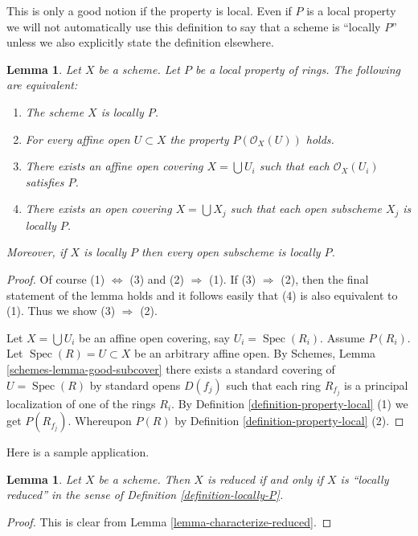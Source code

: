 \documentclass{stacks-project}
\theoremstyle{plain}
\newtheorem{lemma}[subsection]{Lemma}
\theoremstyle{definition}
\theoremstyle{remark}
\numberwithin{equation}{subsection}
\def\Spec{\mathop{\mathrm{Spec}}}
\begin{document}
\noindent
This is only a good notion if the property is local.
Even if $P$ is a local property we will not
automatically use this definition to say that a scheme is
``locally $P$'' unless we also explicitly state the definition
elsewhere.

\begin{lemma}
\label{lemma-locally-P}
Let $X$ be a scheme. Let $P$ be a local property of rings.
The following are equivalent:
\begin{enumerate}
\item The scheme $X$ is locally $P$.
\item For every affine open $U \subset X$ the property
$P(\mathcal{O}_X(U))$ holds.
\item There exists an affine open covering $X = \bigcup U_i$ such that
each $\mathcal{O}_X(U_i)$ satisfies $P$.
\item There exists an open covering $X = \bigcup X_j$
such that each open subscheme $X_j$ is locally $P$.
\end{enumerate}
Moreover, if $X$ is locally $P$ then every open subscheme
is locally $P$.
\end{lemma}

\begin{proof}
Of course (1) $\Leftrightarrow$ (3) and (2) $\Rightarrow$ (1).
If (3) $\Rightarrow$ (2), then the final statement of the lemma
holds and it follows easily that (4) is also equivalent to (1).
Thus we show (3) $\Rightarrow$ (2).

\medskip\noindent
Let $X = \bigcup U_i$ be an affine open covering, say
$U_i = \Spec(R_i)$. Assume $P(R_i)$.
Let $\Spec(R) = U \subset X$ be an arbitrary affine open.
By Schemes, Lemma \ref{schemes-lemma-good-subcover}
there exists a standard covering of $U = \Spec(R)$ by
standard opens $D(f_j)$ such that each ring $R_{f_j}$ is a
principal localization of one of the rings $R_i$. By
Definition \ref{definition-property-local} (1) we get $P(R_{f_j})$.
Whereupon $P(R)$ by Definition \ref{definition-property-local} (2).
\end{proof}

\noindent
Here is a sample application.

\begin{lemma}
\label{lemma-reduced-is-locally-reduced}
Let $X$ be a scheme. Then $X$ is reduced if and only if $X$ is
``locally reduced'' in the sense of Definition \ref{definition-locally-P}.
\end{lemma}

\begin{proof}
This is clear from Lemma \ref{lemma-characterize-reduced}.
\end{proof}
\end{document}
